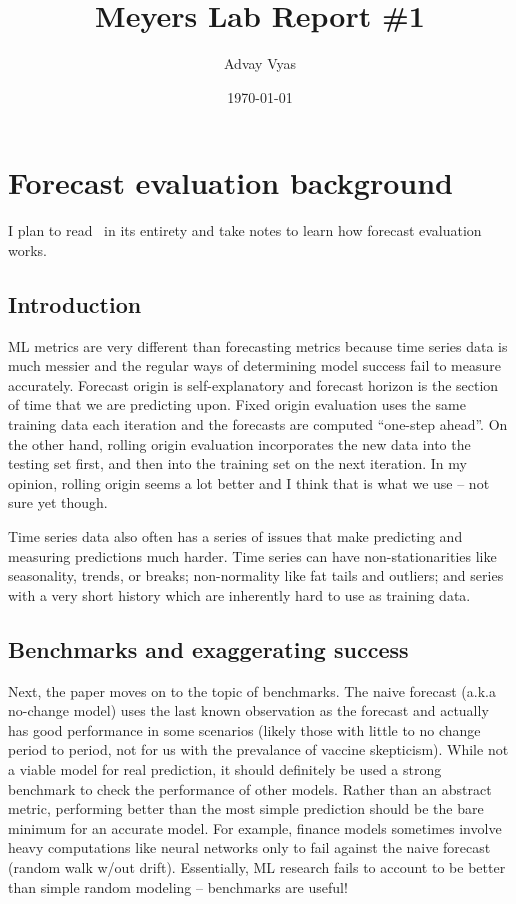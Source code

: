 \documentclass[12pt]{article}
\title{Meyers Lab Report \#1}
\author{Advay Vyas}
\date{\today}
\begin{document}
\maketitle

\tableofcontents
\section{Forecast evaluation background}
I plan to read~\cite{hewamalage23} in its entirety and take notes to learn how forecast evaluation works.
\subsection{Introduction}
ML metrics are very different than forecasting metrics because time series data is much messier and the regular ways of determining model success fail to measure accurately. Forecast origin is self-explanatory and forecast horizon is the section of time that we are predicting upon. Fixed origin evaluation uses the same training data each iteration and the forecasts are computed ``one-step ahead''. On the other hand, rolling origin evaluation incorporates the new data into the testing set first, and then into the training set on the next iteration. In my opinion, rolling origin seems a lot better and I think that is what we use -- not sure yet though. 

Time series data also often has a series of issues that make predicting and measuring predictions much harder. Time series can have non-stationarities like seasonality, trends, or breaks; non-normality like fat tails and outliers; and series with a very short history which are inherently hard to use as training data. 

\subsection{Benchmarks and exaggerating success}
Next, the paper moves on to the topic of benchmarks. The naive forecast (a.k.a no-change model) uses the last known observation as the forecast and actually has good performance in some scenarios (likely those with little to no change period to period, not for us with the prevalance of vaccine skepticism). While not a viable model for real prediction, it should definitely be used a strong benchmark to check the performance of other models. Rather than an abstract metric, performing better than the most simple prediction should be the bare minimum for an accurate model. For example, finance models sometimes involve heavy computations like neural networks only to fail against the naive forecast (random walk w/out drift). Essentially, ML research fails to account to be better than simple random modeling -- benchmarks are useful!
\end{document}
